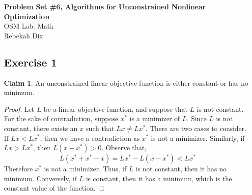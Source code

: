 \documentclass[letterpaper,12pt]{article}
\theoremstyle{definition}
\newtheorem{claim}[theorem]{Claim}
\begin{document}
\begin{flushleft}
  \textbf{\large{Problem Set \#6, Algorithms for Unconstrained Nonlinear Optimization}} \\
  OSM Lab: Math \\
  Rebekah Dix
\end{flushleft}

\vspace{5mm}
\subsection*{Exercise 1}
\begin{claim}
An unconstrained linear objective function is either constant or has no minimum.
\end{claim}
\begin{proof}
Let $L$ be a linear objective function, and suppose that $L$ is not constant.  For the sake of contradiction, suppose $x^*$ is a minimizer of $L$.  Since $L$ is not constant, there exists an $x$ such that $Lx \neq Lx^*$. There are two cases to consider. If $Lx < Lx^*$, then we have a contradiction as $x^*$ is not a minimizer. Similarly, if $Lx > Lx^*$, then $L(x - x^*) > 0$. Observe that,
\begin{equation}
L(x^*  + x^* - x) = Lx^* - L(x - x^*) < Lx^*
\end{equation}
Therefore $x^*$ is not a minimizer. Thus, if $L$ is not constant, then it has no minimum. Conversely, if $L$ is constant, then it has a minimum, which is the constant value of the function.
\end{proof}
\end{document}
